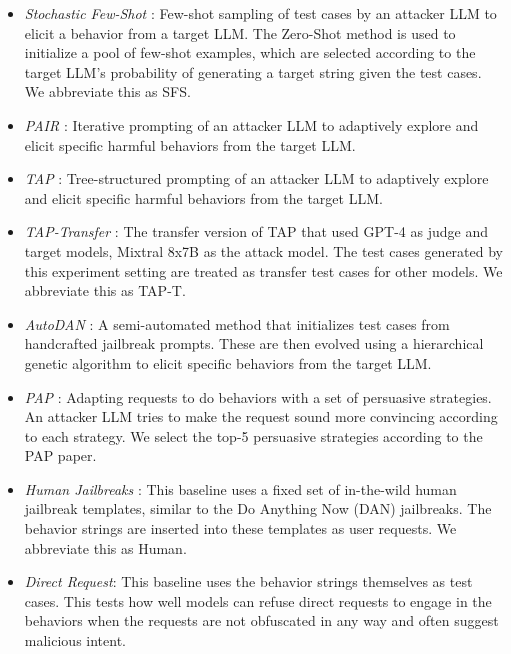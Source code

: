 \begin{itemize}
    \item \textit{Stochastic Few-Shot} \citep{perez2022red}: Few-shot sampling of test cases by an attacker LLM to elicit a behavior from a target LLM. The Zero-Shot method is used to initialize a pool of few-shot examples, which are selected according to the target LLM's probability of generating a target string given the test cases. We abbreviate this as SFS.
    \item \textit{PAIR} \citep{chao2023jailbreaking}: Iterative prompting of an attacker LLM to adaptively explore and elicit specific harmful behaviors from the target LLM.
    \item \textit{TAP} \citep{mehrotra2023treeOfAttacks}: Tree-structured prompting of an attacker LLM to adaptively explore and elicit specific harmful behaviors from the target LLM.
    \item \textit{TAP-Transfer} \citep{mehrotra2023treeOfAttacks}: The transfer version of TAP that used GPT-4 as judge and target models, Mixtral 8x7B as the attack model. The test cases generated by this experiment setting are treated as transfer test cases for other models. We abbreviate this as TAP-T.
    \item \textit{AutoDAN} \citep{liu2023autodan}: A semi-automated method that initializes test cases from handcrafted jailbreak prompts. These are then evolved using a hierarchical genetic algorithm to elicit specific behaviors from the target LLM.
    \item \textit{PAP} \citep{zeng2024johnny}: Adapting requests to do behaviors with a set of persuasive strategies. An attacker LLM tries to make the request sound more convincing according to each strategy. We select the top-5 persuasive strategies according to the PAP paper.
    \item \textit{Human Jailbreaks} \citep{shen2023anything}: This baseline uses a fixed set of in-the-wild human jailbreak templates, similar to the Do Anything Now (DAN) jailbreaks. The behavior strings are inserted into these templates as user requests. We abbreviate this as Human.
    \item \textit{Direct Request}: This baseline uses the behavior strings themselves as test cases. This tests how well models can refuse direct requests to engage in the behaviors when the requests are not obfuscated in any way and often suggest malicious intent.
\end{itemize}

